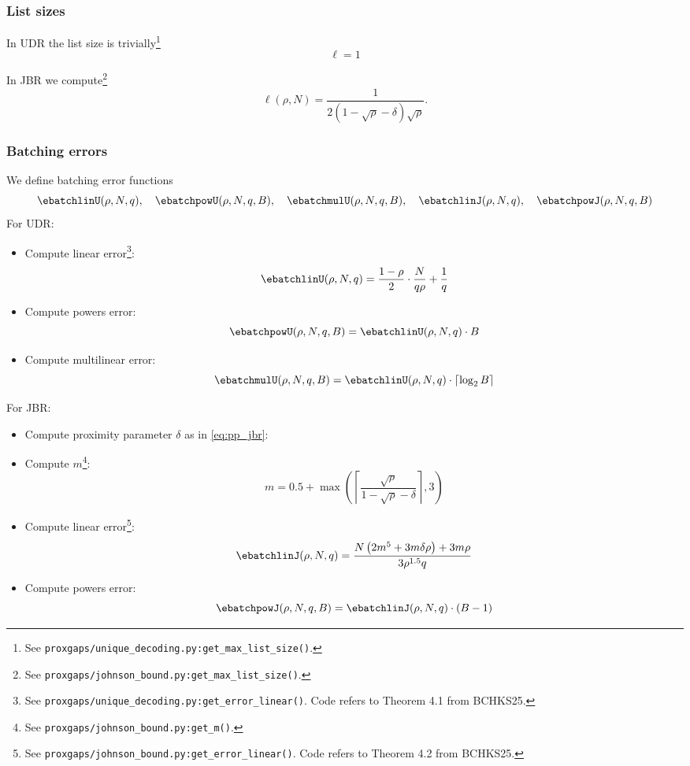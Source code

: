 \subsubsection{List sizes} \label{sec:fri_list_sizes}
In UDR the list size is trivially\footnote{See \texttt{proxgaps/unique\_decoding.py:get\_max\_list\_size()}.}
$$
\ell = 1
$$

In JBR we compute\footnote{See \texttt{proxgaps/johnson\_bound.py:get\_max\_list\_size()}.}
$$
\ell(\rho,N) = \frac{1}{2(1-\sqrt{\rho}-\delta)\sqrt{\rho}}.
$$


\subsubsection{Batching errors}\label{sec:batch}
We define batching error functions
$$
\ebatchlinU(\rho,N,q),\quad \ebatchpowU(\rho,N,q,B),\quad \ebatchmulU(\rho, N, q, B), \quad \ebatchlinJ(\rho,N,q),\quad \ebatchpowJ(\rho,N,q,B)
$$
For UDR:
\begin{itemize}
    \item Compute linear error\footnote{See \texttt{proxgaps/unique\_decoding.py:get\_error\_linear()}. Code refers to Theorem 4.1 from BCHKS25.}:
    $$
    \ebatchlinU(\rho,N,q) = \frac{1 - \rho}{2} \cdot \frac{N}{q\rho} + \frac{1}{q}
    $$
    \item Compute powers error:
    $$
    \ebatchpowU(\rho,N,q,B) = \ebatchlinU( \rho,N,q)\cdot B
    $$
    \item Compute multilinear error:
    $$
    \ebatchmulU(\rho,N,q,B) = \ebatchlinU(\rho,N,q) \cdot \lceil \log_2 B \rceil
    $$
\end{itemize}

For JBR:
\begin{itemize}
    \item Compute proximity parameter $\delta$ as in \eqref{eq:pp_jbr}:

    \item Compute $m$\footnote{See \texttt{proxgaps/johnson\_bound.py:get\_m()}.}:
    $$
    m =0.5+\max\left(\left\lceil\frac{\sqrt{\rho}}{1-\sqrt{\rho}-\delta} \right\rceil,3\right)
    $$
    \item Compute linear error\footnote{See \texttt{proxgaps/johnson\_bound.py:get\_error\_linear()}. Code refers to Theorem 4.2 from BCHKS25.}:
    $$
    \ebatchlinJ(\rho,N,q) = \frac{N\left(2m^5+3m\delta\rho\right)+3m\rho}{3\rho^{1.5}q}
    $$
    \item Compute powers error:
    $$
    \ebatchpowJ(\rho,N,q,B) = \ebatchlinJ( \rho,N,q)\cdot(B-1)
    $$
\end{itemize}



